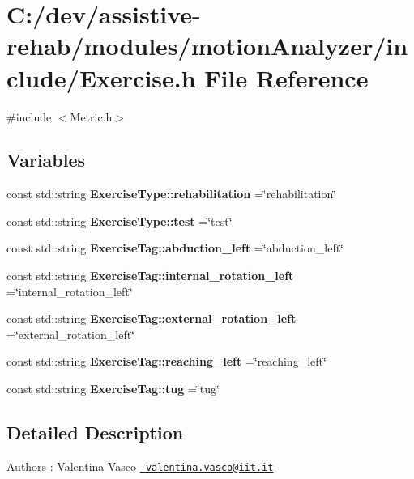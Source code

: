 \section{C\+:/dev/assistive-\/rehab/modules/motion\+Analyzer/include/\+Exercise.h File Reference}
\label{Exercise_8h}
{\ttfamily \#include $<$Metric.\+h$>$}\newline
\subsection*{Variables}
\begin{DoxyCompactItemize}
\item 
\mbox{\label{Exercise_8h_ad3d299b4cbdcf9590a34383c9769552b}} 
const std\+::string {\bfseries Exercise\+Type\+::rehabilitation} =\char`\"{}rehabilitation\char`\"{}
\item 
\mbox{\label{Exercise_8h_a1b9417d7d699f4c9615ac6ca865c2b24}} 
const std\+::string {\bfseries Exercise\+Type\+::test} =\char`\"{}test\char`\"{}
\item 
\mbox{\label{Exercise_8h_a677cff5d00b858887bfc87459677f4c3}} 
const std\+::string {\bfseries Exercise\+Tag\+::abduction\+\_\+left} =\char`\"{}abduction\+\_\+left\char`\"{}
\item 
\mbox{\label{Exercise_8h_aa57cd043979311c1e1dfb6fe25c311e9}} 
const std\+::string {\bfseries Exercise\+Tag\+::internal\+\_\+rotation\+\_\+left} =\char`\"{}internal\+\_\+rotation\+\_\+left\char`\"{}
\item 
\mbox{\label{Exercise_8h_a85804e87dc5e4ce068563687f55eebe6}} 
const std\+::string {\bfseries Exercise\+Tag\+::external\+\_\+rotation\+\_\+left} =\char`\"{}external\+\_\+rotation\+\_\+left\char`\"{}
\item 
\mbox{\label{Exercise_8h_ae4590339042bcaf138b615ef43fd4ce0}} 
const std\+::string {\bfseries Exercise\+Tag\+::reaching\+\_\+left} =\char`\"{}reaching\+\_\+left\char`\"{}
\item 
\mbox{\label{Exercise_8h_a340ab8f95503666972bfff376c1f6627}} 
const std\+::string {\bfseries Exercise\+Tag\+::tug} =\char`\"{}tug\char`\"{}
\end{DoxyCompactItemize}


\subsection{Detailed Description}
\begin{DoxyAuthor}{Authors}
\+: Valentina Vasco \href{mailto:valentina.vasco@iit.it}{\texttt{ valentina.\+vasco@iit.\+it}} 
\end{DoxyAuthor}

